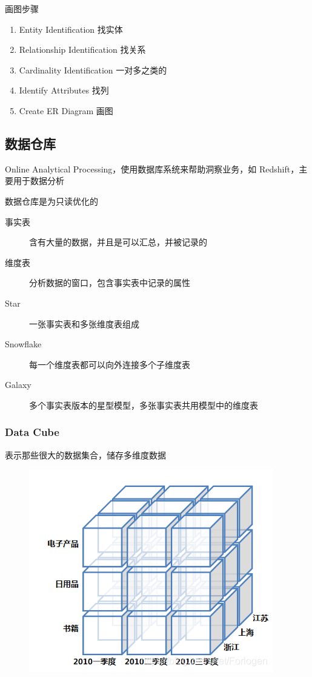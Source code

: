 \documentclass[11pt,journal,compsoc]{IEEEtran}
\begin{document}
画图步骤

\begin{enumerate}
    \item Entity Identification 找实体
    \item Relationship Identification 找关系
    \item Cardinality Identification 一对多之类的
    \item Identify Attributes 找列
    \item Create ER Diagram 画图
\end{enumerate}


\subsection{数据仓库}

Online Analytical Processing，使用数据库系统来帮助洞察业务，如 Redshift，主要用于数据分析

数据仓库是为只读优化的

\begin{description}
    \item[事实表] 含有大量的数据，并且是可以汇总，并被记录的

    \item[维度表] 分析数据的窗口，包含事实表中记录的属性

    \item[Star] 一张事实表和多张维度表组成

    \item[Snowflake] 每一个维度表都可以向外连接多个子维度表

    \item[Galaxy] 多个事实表版本的星型模型，多张事实表共用模型中的维度表
\end{description}


\subsubsection{Data Cube}

表示那些很大的数据集合，储存多维度数据

\begin{figure}[H]
    \centering
    \includegraphics[width=\linewidth]{Cube.png}
\end{figure}
\end{document}

